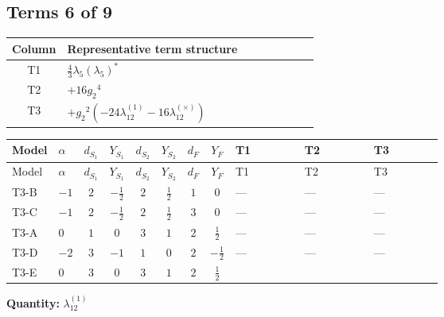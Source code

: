 \documentclass[8pt]{article}
\begin{document}
\begin{landscape}
\subsection*{Terms 6 of 9}
\begin{center}
\begin{tabular}{@{}c >{\raggedright\arraybackslash}p{0.82\linewidth}@{}}
\toprule
Column & Representative term structure \\
\midrule
T1 & \(\displaystyle \frac{4}{3} {\lambda_5} \left({\lambda_5}\right)^{*}\) \\
\midrule
T2 & \(\displaystyle +16 {g_2}^4\) \\
\midrule
T3 & \(\displaystyle +{g_2}^2 (-24 {\lambda_{12}^{(1)}}-16 {\lambda_{12}^{(\times)}})\) \\
\midrule
\bottomrule
\end{tabular}
\end{center}
\smallskip
\tiny
\begin{longtable}{@{}llcccccc >{\raggedright\arraybackslash}p{0.21\linewidth} >{\raggedright\arraybackslash}p{0.21\linewidth} >{\raggedright\arraybackslash}p{0.21\linewidth}@{}}
\toprule
Model & $\alpha$ & $d_{S_1}$ & $Y_{S_1}$ & $d_{S_2}$ & $Y_{S_2}$ & $d_F$ & $Y_F$ & T1 & T2 & T3 \\
\midrule
\endfirsthead
\toprule
Model & $\alpha$ & $d_{S_1}$ & $Y_{S_1}$ & $d_{S_2}$ & $Y_{S_2}$ & $d_F$ & $Y_F$ & T1 & T2 & T3 \\
\midrule
\endhead
T3-B & $-1$ & $2$ & $-\frac{1}{2}$ & $2$ & $\frac{1}{2}$ & $1$ & $0$ & --- & --- & --- \\
\midrule
T3-C & $-1$ & $2$ & $-\frac{1}{2}$ & $2$ & $\frac{1}{2}$ & $3$ & $0$ & --- & --- & --- \\
\midrule
T3-A & $0$ & $1$ & $0$ & $3$ & $1$ & $2$ & $\frac{1}{2}$ & --- & --- & --- \\
\midrule
T3-D & $-2$ & $3$ & $-1$ & $1$ & $0$ & $2$ & $-\frac{1}{2}$ & --- & --- & --- \\
\midrule
T3-E & $0$ & $3$ & $0$ & $3$ & $1$ & $2$ & $\frac{1}{2}$ & \scriptsize\adjustbox{max width=\linewidth}{$\begin{gathered} \frac{4}{3} {\lambda_5} \left({\lambda_5}\right)^{*}\end{gathered}$} & \scriptsize\adjustbox{max width=\linewidth}{$\begin{gathered} +16 {g_2}^4\end{gathered}$} & \scriptsize\adjustbox{max width=\linewidth}{$\begin{gathered} +{g_2}^2 (-24 {\lambda_{12}^{(1)}}-16 {\lambda_{12}^{(\times)}})\end{gathered}$} \\
\midrule
\bottomrule
\end{longtable}
\clearpage
\noindent\textbf{Quantity: }$\lambda_{12}^{(1)}$\par\smallskip

\end{landscape}
\end{document}
